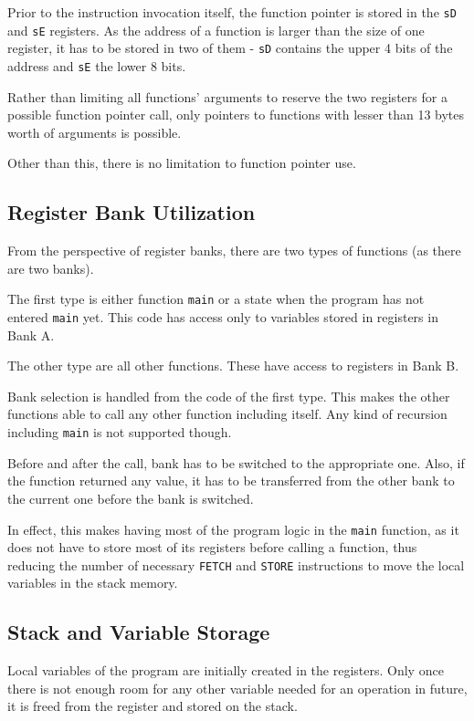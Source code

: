         Prior to the instruction invocation itself, the function pointer is stored in the \texttt{sD} and \texttt{sE} registers. As the address of a function is larger than the size of one register, it has to be stored in two of them - \texttt{sD} contains the upper 4 bits of the address and \texttt{sE} the lower 8 bits.

        Rather than limiting all functions' arguments to reserve the two registers for a possible function pointer call, only pointers to functions with lesser than 13 bytes worth of arguments is possible.

        Other than this, there is no limitation to function pointer use.

        \subsection{Register Bank Utilization}

        From the perspective of register banks, there are two types of functions (as there are two banks). 

        The first type is either function \texttt{main} or a state when the program has not entered \texttt{main} yet. This code has access only to variables stored in registers in Bank A.

        The other type are all other functions. These have access to registers in Bank B.

        Bank selection is handled from the code of the first type. This makes the other functions able to call any other function including itself. Any kind of recursion including \texttt{main} is not supported though.

        Before and after the call, bank has to be switched to the appropriate one. Also, if the function returned any value, it has to be transferred from the other bank to the current one before the bank is switched.

        In effect, this makes having most of the program logic in the \texttt{main} function, as it does not have to store most of its registers before calling a function, thus reducing the number of necessary \texttt{FETCH} and \texttt{STORE} instructions to move the local variables in the stack memory.

        \subsection{Stack and Variable Storage}

        Local variables of the program are initially created in the registers. Only once there is not enough room for any other variable needed for an operation in future, it is freed from the register and stored on the stack.

